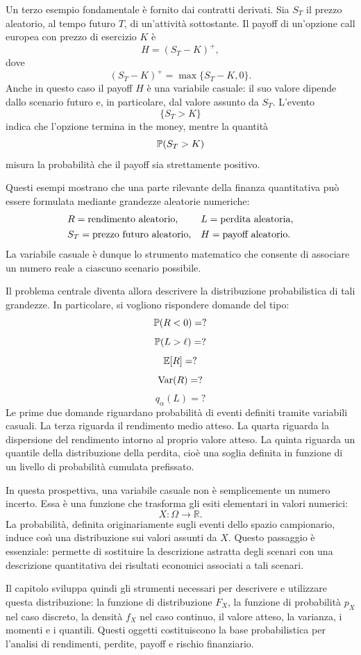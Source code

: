 Un terzo esempio fondamentale \`{e} fornito dai contratti derivati. Sia
$S_{T}$ il prezzo aleatorio, al tempo futuro $T$, di un'attivit\`{a}
sottostante. Il payoff di un'opzione call europea con prezzo di esercizio $K$
\`{e}
\[
H=(S_{T}-K)^{+},
\]
dove
\[
(S_{T}-K)^{+}=\max\{S_{T}-K,0\}.
\]
Anche in questo caso il payoff $H$ \`{e} una variabile casuale: il suo valore
dipende dallo scenario futuro e, in particolare, dal valore assunto da $S_{T}%
$. L'evento
\[
\{S_{T}>K\}
\]
indica che l'opzione termina in the money, mentre la quantit\`{a}
\[
\mathbb{P}(S_{T}>K)
\]
misura la probabilit\`{a} che il payoff sia strettamente positivo.

Questi esempi mostrano che una parte rilevante della finanza quantitativa
pu\`{o} essere formulata mediante grandezze aleatorie numeriche:
\[%
\begin{array}
[c]{ll}%
R=\mbox{rendimento aleatorio}, & L=\mbox{perdita aleatoria},\\[4pt]%
S_{T}=\mbox{prezzo futuro aleatorio}, & H=\mbox{payoff aleatorio}.
\end{array}
\]
La variabile casuale \`{e} dunque lo strumento matematico che consente di
associare un numero reale a ciascuno scenario possibile.

Il problema centrale diventa allora descrivere la distribuzione probabilistica
di tali grandezze. In particolare, si vogliono rispondere domande del tipo:
\[
\mathbb{P}(R<0)=?
\]
\[
\mathbb{P}(L>\ell)=?
\]
\[
\mathbb{E}[R]=?
\]
\[
\operatorname{Var}(R)=?
\]
\[
q_{\alpha}(L)=?
\]
Le prime due domande riguardano probabilit\`{a} di eventi definiti tramite
variabili casuali. La terza riguarda il rendimento medio atteso. La quarta
riguarda la dispersione del rendimento intorno al proprio valore atteso. La quinta riguarda un quantile della distribuzione della perdita, cio\`{e} una
soglia definita in funzione di un livello di probabilit\`{a} cumulata
prefissato.

In questa prospettiva, una variabile casuale non \`{e} semplicemente un numero
incerto. Essa \`{e} una funzione che trasforma gli esiti elementari in valori
numerici:
\[
X:\Omega\longrightarrow\mathbb{R}.
\]
La probabilit\`{a}, definita originariamente sugli eventi dello spazio
campionario, induce cos\`{\i} una distribuzione sui valori assunti da $X$.
Questo passaggio \`{e} essenziale: permette di sostituire la descrizione
astratta degli scenari con una descrizione quantitativa dei risultati
economici associati a tali scenari.

Il capitolo sviluppa quindi gli strumenti necessari per descrivere e
utilizzare questa distribuzione: la funzione di distribuzione $F_{X}$, la
funzione di probabilit\`{a} $p_{X}$ nel caso discreto, la densit\`{a} $f_{X}$ nel caso
continuo, il valore atteso, la varianza, i momenti e i quantili. Questi
oggetti costituiscono la base probabilistica per l'analisi di rendimenti,
perdite, payoff e rischio finanziario.

